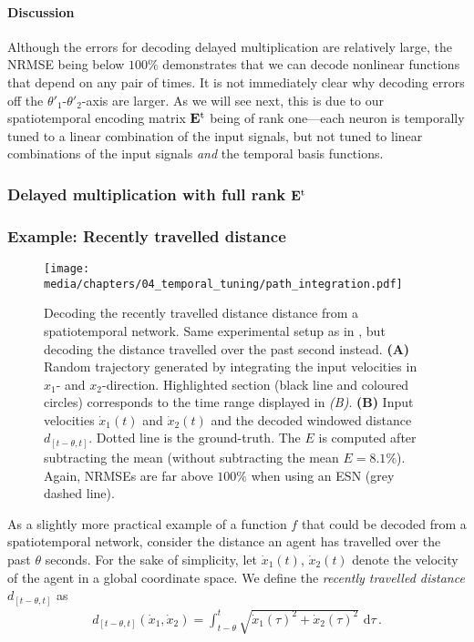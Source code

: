 \paragraph{Discussion}
Although the errors for decoding delayed multiplication are relatively large, the NRMSE being below $100\%$ demonstrates that we can decode nonlinear functions that depend on any pair of times.
It is not immediately clear why decoding errors off the $\theta'_1$-$\theta'_2$-axis are larger.
As we will see next, this is due to our spatiotemporal encoding matrix $\mathbf{E}^\mathrm{t}$ being of rank one---each neuron is temporally tuned to a linear combination of the input signals, but not tuned to linear combinations of the input signals \emph{and} the temporal basis functions.


\subsubsection{Delayed multiplication with full rank $\mathbf{E}^\mathrm{t}$}




\subsubsection{Example: Recently travelled distance}

\begin{figure}
	\texttt{[image: media/chapters/04\_temporal\_tuning/path\_integration.pdf]}
	\caption[Decoding the recently travelled distance distance from a spatiotemporal network]{Decoding the recently travelled distance distance from a spatiotemporal network. Same experimental setup as in , but decoding the distance travelled over the past second instead.
	\textbf{(A)} Random trajectory generated by integrating the input velocities in $x_1$- and $x_2$-direction.
	Highlighted section (black line and coloured circles) corresponds to the time range displayed in \emph{(B)}.
	\textbf{(B)} Input velocities $\dot x_1(t)$ and $\dot x_2(t)$ and the decoded windowed distance $d_{[t - \theta, t]}$.
	Dotted line is the ground-truth. The \NRMSE $E$ is computed after subtracting the mean (without subtracting the mean $E = 8.1\%$).
	Again, NRMSEs are far above $100\%$ when using an ESN (grey dashed line).
	}
	\label{fig:path_integration}
\end{figure}

As a slightly more practical example of a function $f$ that could be decoded from a spatiotemporal network, consider the distance an agent has travelled over the past $\theta$ seconds.
For the sake of simplicity, let $\dot x_1(t)$, $\dot x_2(t)$ denote the velocity of the agent in a global coordinate space.
We define the \emph{recently travelled distance} $d_{[t - \theta, t]}$ as
\begin{align*}
	d_{[t - \theta, t]}(\dot x_1, \dot x_2) = \int_{t - \theta}^t \sqrt{\dot x_1(\tau)^2 + \dot x_2(\tau)^2} \,\,\mathrm{d}\tau \,.
\end{align*}

